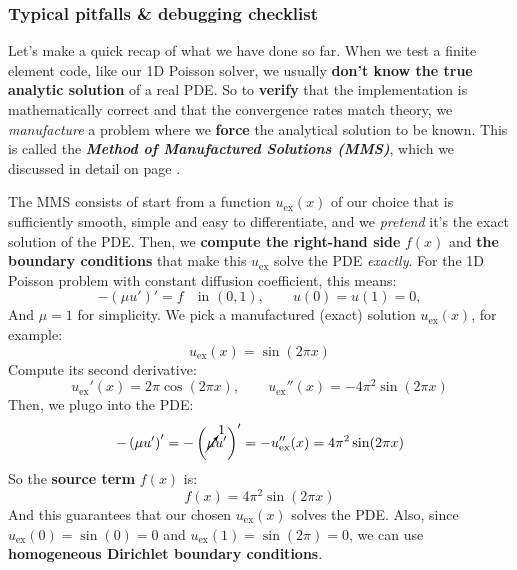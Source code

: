 \subsubsection{Typical pitfalls \& debugging checklist}

Let's make a quick recap of what we have done so far. When we test a finite element code, like our 1D Poisson solver, we usually \textbf{don't know the true analytic solution} of a real PDE. So to \textbf{verify} that the implementation is mathematically correct and that the convergence rates match theory, we \emph{manufacture} a problem where we \textbf{force} the analytical solution to be known. This is called the \textbf{\emph{Method of Manufactured Solutions (MMS)}}, which we discussed in detail on page .

\highspace
The MMS consists of start from a function $u_{\text{ex}}(x)$ of our choice that is sufficiently smooth, simple and easy to differentiate, and we \emph{pretend} it's the exact solution of the PDE. Then, we \textbf{compute the right-hand side} $f(x)$ and \textbf{the boundary conditions} that make this $u_{\text{ex}}$ solve the PDE \emph{exactly}. For the 1D Poisson problem with constant diffusion coefficient, this means:
\begin{equation*}
    -\left(\mu u'\right)' = f \quad \text{in } \left(0, 1\right), \qquad u(0) = u(1) = 0,
\end{equation*}
And $\mu = 1$ for simplicity. We pick a manufactured (exact) solution $u_{\text{ex}}(x)$, for example:
\begin{equation*}
    u_{\text{ex}}(x) = \sin(2 \pi x)
\end{equation*}
Compute its second derivative:
\begin{equation*}
    u_{\text{ex}}'(x) = 2 \pi \cos(2 \pi x), \qquad u_{\text{ex}}''(x) = -4 \pi^2 \sin(2 \pi x)
\end{equation*}
Then, we plugo into the PDE:
\begin{equation*}
    -\left(\mu u'\right)' = -\left(\cancelto{1}{\mu} u'\right)' = -u_{\text{ex}}''(x) = 4 \pi^2 \sin(2 \pi x)
\end{equation*}
So the \textbf{source term} $f(x)$ is:
\begin{equation*}
    f(x) = 4 \pi^2 \sin(2 \pi x)
\end{equation*}
And this guarantees that our chosen $u_{\text{ex}}(x)$ solves the PDE. Also, since $u_{\text{ex}}(0) = \sin(0) = 0$ and $u_{\text{ex}}(1) = \sin(2 \pi) = 0$, we can use \textbf{homogeneous Dirichlet boundary conditions}.


